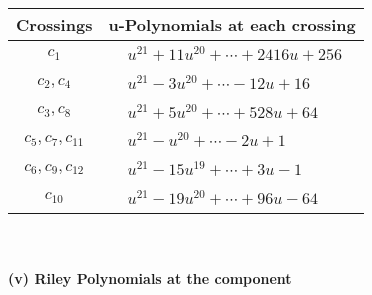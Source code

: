 \documentclass[1p]{elsarticle_modified}
\theoremstyle{definition}
\begin{document}
\begin{tabular}{m{50pt}|m{274pt}}
Crossings & \hspace{64pt}u-Polynomials at each crossing \\
\hline $$\begin{aligned}c_{1}\end{aligned}$$&$\begin{aligned}
&u^{21}+11 u^{20}+\cdots+2416 u+256
\end{aligned}$\\
\hline $$\begin{aligned}c_{2},c_{4}\end{aligned}$$&$\begin{aligned}
&u^{21}-3 u^{20}+\cdots-12 u+16
\end{aligned}$\\
\hline $$\begin{aligned}c_{3},c_{8}\end{aligned}$$&$\begin{aligned}
&u^{21}+5 u^{20}+\cdots+528 u+64
\end{aligned}$\\
\hline $$\begin{aligned}c_{5},c_{7},c_{11}\end{aligned}$$&$\begin{aligned}
&u^{21}- u^{20}+\cdots-2 u+1
\end{aligned}$\\
\hline $$\begin{aligned}c_{6},c_{9},c_{12}\end{aligned}$$&$\begin{aligned}
&u^{21}-15 u^{19}+\cdots+3 u-1
\end{aligned}$\\
\hline $$\begin{aligned}c_{10}\end{aligned}$$&$\begin{aligned}
&u^{21}-19 u^{20}+\cdots+96 u-64
\end{aligned}$\\
\hline
\end{tabular}\\~\\
\newpage\renewcommand{\arraystretch}{1}
\flushleft \textbf{(v) Riley Polynomials at the component}\newline \\
\end{document}

